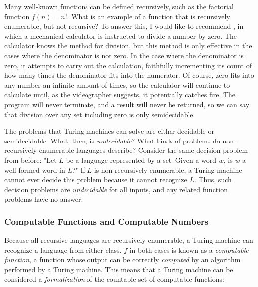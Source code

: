 \begin{tcolorbox}[breakable, enhanced, colback=textbook-blue, sharp corners]
	Many well-known functions can be defined recursively, such as the factorial function $f(n)=n!$. What is an example of a function that is recursively enumerable, but not recursive? To answer this, I would like to recommend , in which a mechanical calculator is instructed to divide a number by zero. The calculator knows the method for division, but this method is only effective in the cases where the denominator is not zero. In the case where the denominator is zero, it attempts to carry out the calculation, faithfully incrementing its count of how many times the denominator fits into the numerator. Of course, zero fits into any number an infinite amount of times, so the calculator will continue to calculate until, as the videographer suggests, it potentially catches fire. The program will never terminate, and a result will never be returned, so we can say that division over any set including zero is only semidecidable.
	\vspace{1mm}
\end{tcolorbox}
\vspace{7mm}

The problems that Turing machines can solve are either decidable or semidecidable. What, then, is \textit{undecidable}? What kinds of problems do non-recursively enumerable languages describe? Consider the same decision problem from before: "Let $L$ be a language represented by a set. Given a word $w$, is $w$ a well-formed word in $L$?" If $L$ is non-recursively enumerable, a Turing machine cannot ever decide this problem because it cannot recognize $L$. Thus, such decision problems are \textit{undecidable} for all inputs, and any related function problems have no answer. \\

\subsubsection{Computable Functions and Computable Numbers}

Because all recursive languages are recursively enumerable, a Turing machine can recognize a language from either class. $f$ in both cases is known as a \textit{computable function}, a function whose output can be correctly \textit{computed} by an algorithm performed by a Turing machine. This means that a Turing machine can be considered a \textit{formalization} of the countable set of computable functions:

